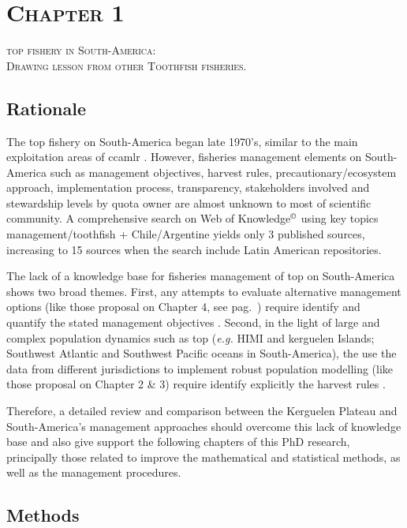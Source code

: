 \section*{\scshape Chapter 1}
{\Large \scshape \acl{top} fishery in South-America: \\ Drawing lesson from other Toothfish fisheries.} %

\subsection*{Rationale}

The \acl{top} fishery on South-America began late 1970's, similar to the main exploitation areas of \ac{ccamlr} \citep{FAO2014,ccamlr90}. However, fisheries management elements on South-America such as management objectives, harvest rules, precautionary/ecosystem approach, implementation process, transparency, stakeholders involved and stewardship levels by quota owner are almost unknown to most of scientific community. A comprehensive search on Web of Knowledge$^{\copyright}$ using key topics management/toothfish + Chile/Argentine yields only 3 published sources,  increasing to 15 sources when the search include Latin American repositories.

The lack of a knowledge base for fisheries management of \acl{top} on South-America shows two broad themes. First, any attempts to evaluate alternative management options (like those proposal on Chapter 4, see pag.~\pageref{sec:chapter4}) require identify and quantify the stated management objectives \citep{Aranda,Deroba2008,Milner-Gulland2011}. Second, in the light of large and complex population dynamics such as \acl{top} (\emph{e.g.} HIMI and kerguelen Islands; Southwest Atlantic and Southwest Pacific oceans in South-America), the use the data from different jurisdictions to implement robust population modelling (like those proposal on Chapter 2 \& 3) require identify explicitly the harvest rules \citep{Constable2000778}.

Therefore, a detailed review and comparison between the Kerguelen Plateau and South-America's management approaches should overcome this lack of knowledge base and also give support the following chapters of this PhD research, principally those related to improve the mathematical and statistical methods, as well as the management procedures.


\subsection*{Methods}

